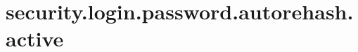 \section{security.login.password.autorehash.active}
\label{configuration:SecurityLoginPasswordAutorehashActive}
\TODO
